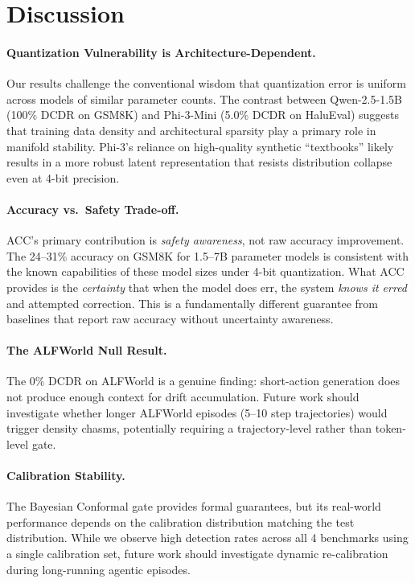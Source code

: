 \documentclass[runningheads]{article} %
\begin{document}
\section{Discussion}
\enlargethispage{2\baselineskip}
\label{sec:discussion}

\paragraph{Quantization Vulnerability is Architecture-Dependent.}
Our results challenge the conventional wisdom that quantization error
is uniform across models of similar parameter counts.
The contrast between Qwen-2.5-1.5B (100\% DCDR on GSM8K) and Phi-3-Mini
(5.0\% DCDR on HaluEval) suggests that training data density and
architectural sparsity play a primary role in manifold stability.
Phi-3's reliance on high-quality synthetic ``textbooks'' likely results
in a more robust latent representation that resists distribution collapse
even at 4-bit precision.

\paragraph{Accuracy vs.\ Safety Trade-off.}
ACC's primary contribution is \emph{safety awareness}, not raw accuracy
improvement. The 24--31\% accuracy on GSM8K for 1.5--7B parameter models
is consistent with the known capabilities of these model sizes under
4-bit quantization. What ACC provides is the \emph{certainty} that
when the model does err, the system \emph{knows it erred} and attempted
correction. This is a fundamentally different guarantee from
baselines that report raw accuracy without uncertainty awareness.

\paragraph{The ALFWorld Null Result.}
The 0\% DCDR on ALFWorld is a genuine finding: short-action generation
does not produce enough context for drift accumulation.
Future work should investigate whether longer ALFWorld episodes
(5--10 step trajectories) would trigger density chasms,
potentially requiring a trajectory-level rather than token-level gate.

\paragraph{Calibration Stability.}
The Bayesian Conformal gate provides formal guarantees, but its
real-world performance depends on the calibration distribution
matching the test distribution.
While we observe high detection rates across all 4 benchmarks using
a single calibration set, future work should investigate dynamic
re-calibration during long-running agentic episodes.
\end{document}
